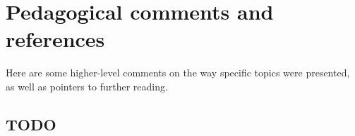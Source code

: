 \chapter{Pedagogical comments and references}\label{ch:refs}
Here are some higher-level comments on the way specific topics were presented,
as well as pointers to further reading.

\section{TODO}

